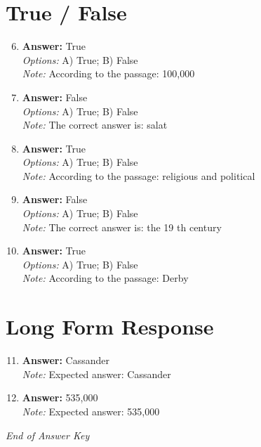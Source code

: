 \documentclass[12pt]{article}
\begin{document}
\section*{True / False}
\begin{enumerate}[label=\arabic*.]
\setcounter{enumi}{5}
\item \textbf{Answer:} True
\\ \textit{Options:} A) True; B) False
\\ \textit{Note:} According to the passage: 100,000
\item \textbf{Answer:} False
\\ \textit{Options:} A) True; B) False
\\ \textit{Note:} The correct answer is: salat
\item \textbf{Answer:} True
\\ \textit{Options:} A) True; B) False
\\ \textit{Note:} According to the passage: religious and political
\item \textbf{Answer:} False
\\ \textit{Options:} A) True; B) False
\\ \textit{Note:} The correct answer is: the 19 th century
\item \textbf{Answer:} True
\\ \textit{Options:} A) True; B) False
\\ \textit{Note:} According to the passage: Derby
\end{enumerate}

\section*{Long Form Response}
\begin{enumerate}[label=\arabic*.]
\setcounter{enumi}{10}
\item \textbf{Answer:} Cassander
\\ \textit{Note:} Expected answer: Cassander
\item \textbf{Answer:} 535,000
\\ \textit{Note:} Expected answer: 535,000
\end{enumerate}

\vfill
\noindent\textit{End of Answer Key}
\end{document}

